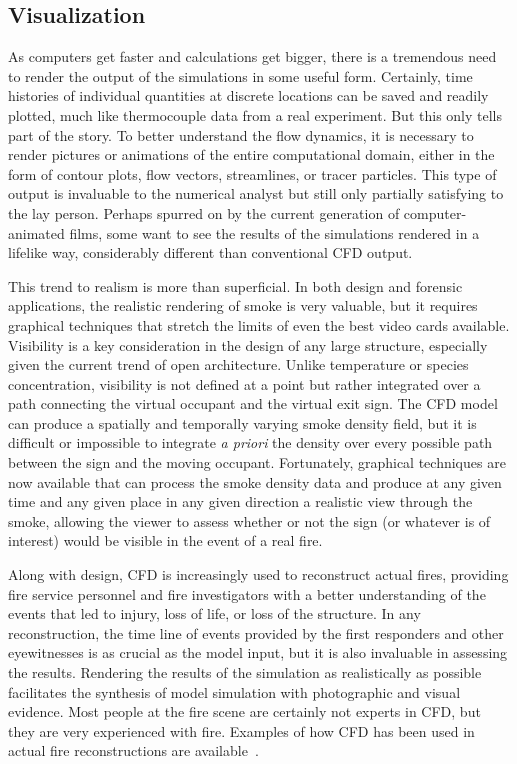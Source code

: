 \documentclass[graybox]{svmult}
\begin{document}
\subsection{Visualization}

As computers get faster and calculations get bigger, there is a tremendous need to render the output of the simulations in some useful form. Certainly, time histories of individual quantities at discrete locations can be saved and readily plotted, much like thermocouple data from a real experiment. But this only tells part of the story. To better understand the flow dynamics, it is necessary to render pictures or animations of the entire computational domain, either in the form of contour plots, flow vectors, streamlines, or tracer particles. This type of output is invaluable to the numerical analyst but still only partially satisfying to the lay person. Perhaps spurred on by the current generation of computer-animated films, some want to see the results of the simulations rendered in a lifelike way, considerably different than conventional CFD output.

This trend to realism is more than superficial. In both design and forensic applications, the realistic rendering of smoke is very valuable, but it requires graphical techniques that stretch the limits of even the best video cards available. Visibility is a key consideration in the design of any large structure, especially given the current trend of open architecture. Unlike temperature or species concentration, visibility is not defined at a point but rather integrated over a path connecting the virtual occupant and the virtual exit sign. The CFD model can produce a spatially and temporally varying smoke density field, but it is difficult or impossible to integrate {\em a priori} the density over every possible path between the sign and the moving occupant. Fortunately, graphical techniques are now available that can process the smoke density data and produce at any given time and any given place in any given direction a realistic view through the smoke, allowing the viewer to assess whether or not the sign (or whatever is of interest) would be visible in the event of a real fire.

Along with design, CFD is increasingly used to reconstruct  actual  fires,  providing  fire  service  personnel and fire investigators with a better understanding of the events that led to injury, loss of life, or loss of the structure. In any reconstruction, the time line of events provided by the first responders and other eyewitnesses is as crucial as the model input, but it is also invaluable in assessing the results. Rendering the results of the simulation as realistically as possible facilitates the synthesis of model simulation with photographic and visual evidence. Most people at the fire scene are certainly not experts in CFD, but they are very experienced with fire. Examples of how CFD has been used in actual fire reconstructions are available~\cite{Grosshandler, McGrattan:2005, Madrzykowski:2000, Madrzykowski:2004, Christensen}.
\end{document}
